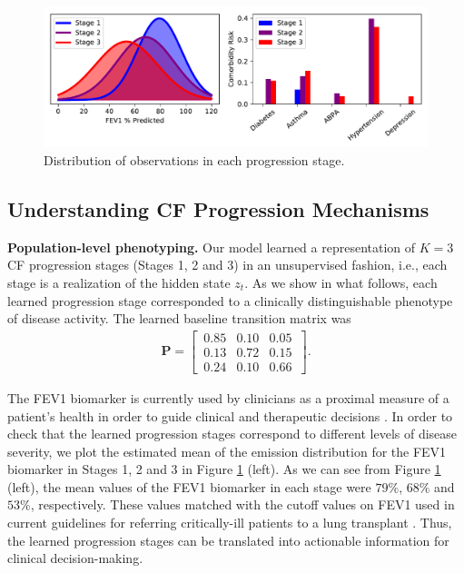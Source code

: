 \documentclass [PhD] {uclathes}
\begin{document}
\begin{figure}[h]
\centering
\includegraphics[width=5.5in]{ch5Fig5.pdf}
\caption{Distribution of observations in each progression stage.}
\label{ch5fig5}
\end{figure}

\subsection{Understanding CF Progression Mechanisms}
\label{ch5sec51}
{\bf Population-level phenotyping.}\,\,Our model learned a representation of $K=3$ CF progression stages (Stages 1, 2 and 3) in an unsupervised fashion, i.e., each stage is a realization of the hidden state $z_t$. As we show in what follows, each learned progression stage corresponded to a clinically distinguishable phenotype of disease activity. The learned baseline transition matrix was
\begin{align}
\boldsymbol{P} = \begin{bmatrix}
\, 0.85 & 0.10 & 0.05  \, \\
\, 0.13 & 0.72 & 0.15 \, \\
\, 0.24 & 0.10 & 0.66 \,
  \end{bmatrix}. \nonumber
\end{align}   

The FEV1 biomarker is currently used by clinicians as a proximal measure of a patient's health in order to guide clinical and therapeutic decisions \cite{braun2011cystic}. In order to check that the learned progression stages correspond to different levels of disease severity, we plot the estimated mean of the emission distribution for the FEV1 biomarker in Stages 1, 2 and 3 in Figure \ref{ch5fig5} (left). As we can see from Figure \ref{ch5fig5} (left), the mean values of the FEV1 biomarker in each stage were $79\%$, $68\%$ and $53\%$, respectively. These values matched with the cutoff values on FEV1 used in current guidelines for referring critically-ill patients to a lung transplant \cite{braun2011cystic}. Thus, the learned progression stages can be translated into actionable information for clinical decision-making.
\end{document}
